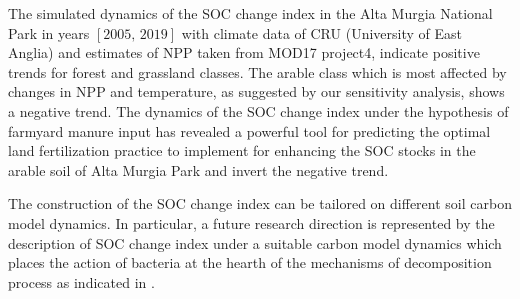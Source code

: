 \noindent The simulated dynamics of the SOC change index in the Alta Murgia National Park in years $[2005,\, 2019]$ with climate data of CRU  (University  of  East Anglia) and  estimates of NPP taken  from  MOD17  project4,  indicate positive trends for forest and grassland classes. The arable class which is most affected by changes in NPP and temperature, as suggested by our sensitivity analysis, shows a negative trend. 
The dynamics of the SOC change index under the hypothesis of farmyard manure input has revealed a powerful tool for predicting the optimal land fertilization practice to implement for enhancing the  SOC stocks in the arable soil of Alta Murgia Park and invert the negative trend. 


\noindent The construction of the SOC change index can be tailored on different soil carbon model dynamics. In particular, a future research direction is  represented  by the description of SOC change index under a suitable carbon model dynamics which  places the action of bacteria at the hearth of the  mechanisms of decomposition  process as indicated in \cite{lehmann2015contentious,hammoudi2015mathematical}. 







%
%



%
%

